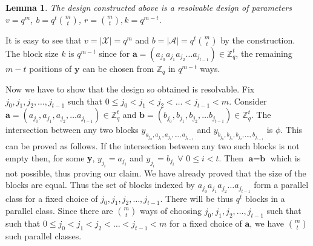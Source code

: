 \documentclass[conference]{IEEEtran}
\newtheorem{lem}{Lemma}
\begin{document}
\begin{lem}
		The design constructed above is a resolvable design of parameters $v = q^{m}$, $b = q^{t} {{m}\choose{t}}$, $r = {{m}\choose{t}}, k = q^{m-t} $.	
\end{lem}
\begin{IEEEproof}
		It is easy to see that $v = |\mathcal{X}| = q^m	$ and $b = |\mathcal{A}| =  q^{t} {{m}\choose{t}}	$ by the construction. The block size $k$ is $q^{m-t}$ since for $\textbf{a} = (a_{j_0} a_{j_1} a_{j_2} \dots a_{j_{t-1}}) \in \mathbb{Z}_q^t$, the remaining $m - t$ positions of $\textbf{y}$ can be chosen from $\mathbb{Z}_q$ in $q^{m-t}$ ways.

Now we have to show that the design so obtained is resolvable.  Fix $j_0, j_1, j_2, \dots, j_{t-1}$ such that $0 \leq j_0 < j_1 < j_2 < \dots < j_{t-1} < m$. Consider $\textbf{a} = (a_{j_0}, a_{j_1}, a_{j_2}, \dots a_{j_{t-1}}) \in \mathbb{Z}_q^t$ and $\textbf{b} = (b_{j_0}, b_{j_1}, b_{j_2}, \dots b_{j_{t-1}}) \in \mathbb{Z}_q^t$.
		The intersection between any two blocks $y_{a_{j_0}, a_{j_1}, a_{j_2},\dots,a_{j_{t-1}}}$ and  $ y_{b_{j_0}, b_{j_1}, b_{j_2},\dots,b_{j_{t-1}}}$ is $\phi$. This can be proved as follows. If the intersection between any two such blocks is not empty then, for some \textbf{y}, $y_{j_i} = a_{j_i}$ and $y_{j_i} = b_{j_i}$ $\forall$  $0\leq i<t$. Then $\textbf{a} = \textbf{b}$ which is not possible, thus proving our claim.
		We have already proved that the size of the blocks are equal. Thus the set of blocks indexed by $a_{j_0} a_{j_1} a_{j_2} \dots a_{j_{t-1}}$ form a parallel class for a fixed choice of $j_0, j_1, j_2, \dots ,j_{t-1}$.
		There will be thus $q^t$ blocks in a parallel class. Since there are ${{m}\choose{t}}$ ways of choosing $j_0, j_1, j_2, \dots, j_{t-1}$ such that such that $0 \leq j_0 < j_1 < j_2 < \dots < j_{t-1} < m$ for a fixed choice of $\textbf{a}$, we have ${{m}\choose{t}}$ such parallel classes. 
	\end{IEEEproof} 
\end{document}
